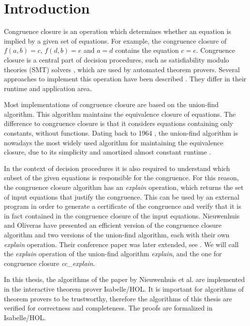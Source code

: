 
\chapter{Introduction}\label{chapter:introduction}

Congruence closure is an operation which determines whether an equation is implied by a given set of equations.
For example, the congruence closure of $f(a,b) = c$, $f(d,b) = e$ and $a = d$ contains the equation $c = e$.
Congruence closure is a central part of decision procedures, such as satisfiability modulo theories (SMT) solvers \cite{z3}, which are used by automated theorem provers.
Several approaches to implement this operation have been described \cite{congruenceclosure-og2,congruenceclosure-og,congruenceclosure-og3,Nieuwenhuis}.
They differ in their runtime and application area.


Most implementations of congruence closure are based on the union-find algorithm. This algorithm maintains the equivalence closure of equations. The difference to congruence closure is that it considers equations containing only constants, without functions.
Dating back to 1964 \cite{unionfind-og}, the union-find algorithm is nowadays the most widely used algorithm for maintaining the equivalence closure, due to its simplicity and amortized almost constant runtime \cite{Tarjan}.

In the context of decision procedures it is also required to understand which subset of the given equations is responsible for the congruence. For this reason, the congruence closure algorithm has an \emph{explain} operation, which returns the set of input equations that justify the congruence.
This can be used by an external program in order to generate a certificate of the congruence and verify that it is in fact contained in the congruence closure of the input equations.
Nieuwenhuis and Oliveras have presented an efficient version of the congruence closure algorithm and two versions of the union-find algorithm, each with their own \emph{explain} operation. Their conference paper \cite{Nieuwenhuis} was later extended, see \cite{Nieuwenhuis2}.
We will call the \emph{explain} operation of the union-find algorithm \emph{explain}, and the one for congruence closure \emph{cc\_explain}.

In this thesis, the algorithms of the paper by Nieuwenhuis et al. \cite{Nieuwenhuis} are implemented in the interactive theorem prover Isabelle/HOL.
It is important for algorithms of theorem provers to be trustworthy, therefore the algorithms of this thesis are verified for correctness and completeness.
The proofs are formalized in Isabelle/HOL.

